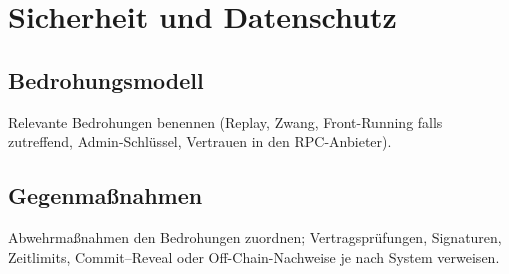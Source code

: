 \chapter{Sicherheit und Datenschutz}

\section{Bedrohungsmodell}
Relevante Bedrohungen benennen (Replay, Zwang, Front-Running falls
zutreffend, Admin-Schlüssel, Vertrauen in den RPC-Anbieter).

\section{Gegenmaßnahmen}
Abwehrmaßnahmen den Bedrohungen zuordnen; Vertragsprüfungen, Signaturen,
Zeitlimits, Commit--Reveal oder Off-Chain-Nachweise je nach System
verweisen.
